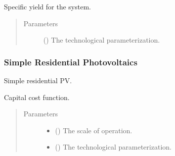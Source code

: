\documentclass[letterpaper,10pt,english]{sphinxmanual}
\begin{document}
\begin{fulllineitems}
\label{\detokenize{technology:technology.pv_residential_large.specific_yield}}
Specific yield for the system.
\begin{quote}\begin{description}
\item[{Parameters}] \leavevmode
{} () \textendash{} The technological parameterization.

\end{description}\end{quote}

\end{fulllineitems}



\subsubsection{Simple Residential Photovoltaics}
\label{\detokenize{technology:module-technology.pv_residential_simple}}\label{\detokenize{technology:simple-residential-photovoltaics}}
Simple residential PV.

\begin{fulllineitems}
\label{\detokenize{technology:technology.pv_residential_simple.capital_cost}}
Capital cost function.
\begin{quote}\begin{description}
\item[{Parameters}] \leavevmode\begin{itemize}
\item {} 
 () \textendash{} The scale of operation.

\item {} 
 () \textendash{} The technological parameterization.

\end{itemize}

\end{description}\end{quote}

\end{fulllineitems}
\end{document}
